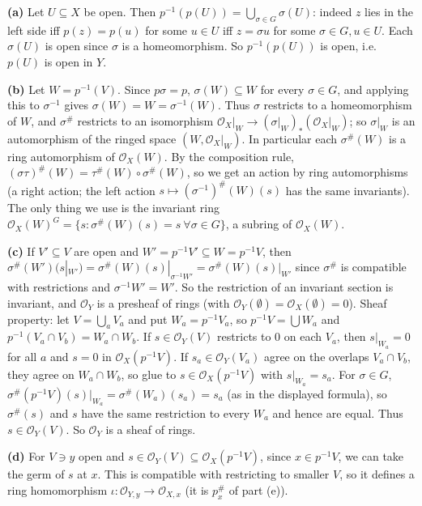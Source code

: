 \documentclass[11pt]{article}
\begin{document}
\textbf{(a)} Let $U\subseteq X$ be open. Then $p^{-1}(p(U))=\bigcup_{\sigma\in G}\sigma(U)$: indeed $z$ lies in the left side iff $p(z)=p(u)$ for some $u\in U$ iff $z=\sigma u$ for some $\sigma\in G,u\in U$. Each $\sigma(U)$ is open since $\sigma$ is a homeomorphism. So $p^{-1}(p(U))$ is open, i.e.\ $p(U)$ is open in $Y$.

\textbf{(b)} Let $W=p^{-1}(V)$. Since $p\sigma=p$, $\sigma(W)\subseteq W$ for every $\sigma\in G$, and applying this to $\sigma^{-1}$ gives $\sigma(W)=W=\sigma^{-1}(W)$. Thus $\sigma$ restricts to a homeomorphism of $W$, and $\sigma^\#$ restricts to an isomorphism $\mathcal{O}_X|_W\to(\sigma|_W)_*(\mathcal{O}_X|_W)$; so $\sigma|_W$ is an automorphism of the ringed space $(W,\mathcal{O}_X|_W)$. In particular each $\sigma^\#(W)$ is a ring automorphism of $\mathcal{O}_X(W)$. By the composition rule, $(\sigma\tau)^\#(W)=\tau^\#(W)\circ\sigma^\#(W)$, so we get an action by ring automorphisms (a right action; the left action $s\mapsto(\sigma^{-1})^\#(W)(s)$ has the same invariants). The only thing we use is the invariant ring $\mathcal{O}_X(W)^G=\{s:\sigma^\#(W)(s)=s\ \forall\sigma\in G\}$, a subring of $\mathcal{O}_X(W)$.

\textbf{(c)} If $V'\subseteq V$ are open and $W'=p^{-1}V'\subseteq W=p^{-1}V$, then $\sigma^\#(W')(s|_{W'})=\sigma^\#(W)(s)|_{\sigma^{-1}W'}=\sigma^\#(W)(s)|_{W'}$ since $\sigma^\#$ is compatible with restrictions and $\sigma^{-1}W'=W'$. So the restriction of an invariant section is invariant, and $\mathcal{O}_Y$ is a presheaf of rings (with $\mathcal{O}_Y(\emptyset)=\mathcal{O}_X(\emptyset)=0$). Sheaf property: let $V=\bigcup_aV_a$ and put $W_a=p^{-1}V_a$, so $p^{-1}V=\bigcup W_a$ and $p^{-1}(V_a\cap V_b)=W_a\cap W_b$. If $s\in\mathcal{O}_Y(V)$ restricts to $0$ on each $V_a$, then $s|_{W_a}=0$ for all $a$ and $s=0$ in $\mathcal{O}_X(p^{-1}V)$. If $s_a\in\mathcal{O}_Y(V_a)$ agree on the overlaps $V_a\cap V_b$, they agree on $W_a\cap W_b$, so glue to $s\in\mathcal{O}_X(p^{-1}V)$ with $s|_{W_a}=s_a$. For $\sigma\in G$, $\sigma^\#(p^{-1}V)(s)|_{W_a}=\sigma^\#(W_a)(s_a)=s_a$ (as in the displayed formula), so $\sigma^\#(s)$ and $s$ have the same restriction to every $W_a$ and hence are equal. Thus $s\in\mathcal{O}_Y(V)$. So $\mathcal{O}_Y$ is a sheaf of rings.

\textbf{(d)} For $V\ni y$ open and $s\in\mathcal{O}_Y(V)\subseteq\mathcal{O}_X(p^{-1}V)$, since $x\in p^{-1}V$, we can take the germ of $s$ at $x$. This is compatible with restricting to smaller $V$, so it defines a ring homomorphism $\iota:\mathcal{O}_{Y,y}\to\mathcal{O}_{X,x}$ (it is $p^\#_x$ of part (e)).
\end{document}
